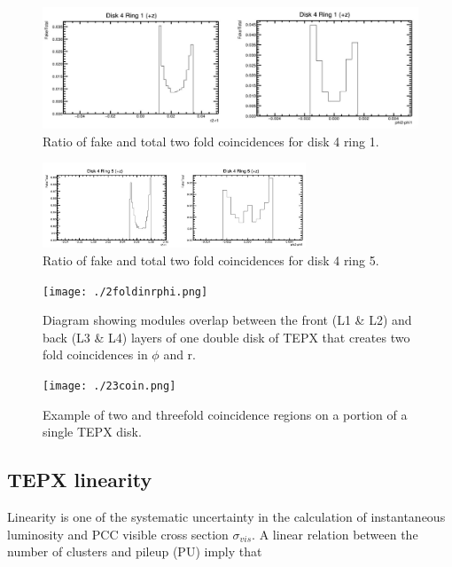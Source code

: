 \begin{figure}[!htp]
\centering
\includegraphics[width=1\textwidth]{ashish_thesis/D4R1_fake_true_ratio.png}
\caption{%
  Ratio of fake and total two fold coincidences for disk 4 ring 1.
}
\label{fig:cluster_ring}
\end{figure}


\begin{figure}[!htp]
\centering
\includegraphics[width=0.7\textwidth]{ashish_thesis/D4R5_fake_true_ratio.png}
\caption{%
  Ratio of fake and total two fold coincidences for disk 4 ring 5.
}
\label{fig:cluster_ring}
\end{figure}

\begin{figure}[H]
  \centering
  \texttt{[image: ./2foldinrphi.png]}
  \caption{ \onehalfspacing Diagram showing modules overlap between the front (L1 \& L2) and back (L3 \& L4) layers of one double disk of TEPX that creates two fold coincidences in $\phi$ and r.}
  \label{fig:CMS}
\end{figure}

\begin{figure}[H]
  \centering
  \texttt{[image: ./23coin.png]}
  \caption{\onehalfspacing Example of two and threefold coincidence regions on a portion of a single TEPX disk.}
  \label{fig:CMS}
\end{figure}

\subsection{TEPX linearity}

Linearity is one of the systematic uncertainty in the calculation of instantaneous luminosity and PCC visible cross section $\sigma_{vis}$. A linear relation between the number of clusters and pileup (PU) imply that \\

